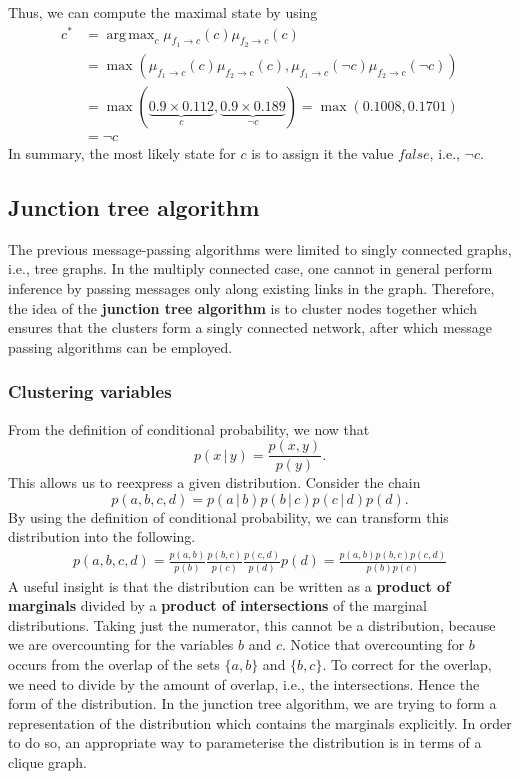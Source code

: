 \documentclass{article}
\DeclareMathOperator*{\argmax}{arg\,max}
\newcommand{\giv}{\,|\,}
\begin{document}
\noindent Thus, we can compute the maximal state by using
\begin{align*}
    c^* &= \argmax_c \mu_{f_1 \rightarrow c}(c) \mu_{f_2 \rightarrow c}(c)\\
    &= \max(\mu_{f_1 \rightarrow c}(c) \mu_{f_2 \rightarrow c}(c), \mu_{f_1 \rightarrow c}(\neg c) \mu_{f_2 \rightarrow c}(\neg c)) \\
    &= \max(\underbrace{0.9 \times 0.112}_{c}, \underbrace{0.9 \times 0.189}_{\neg c}) = \max(0.1008, 0.1701)\\
    &= \neg c
\end{align*}
\noindent In summary, the most likely state for $c$ is to assign it the value $false$, i.e., $\neg c$.

\subsection{Junction tree algorithm}

The previous message-passing algorithms were limited to singly connected graphs, i.e., tree graphs. In the multiply connected case, one cannot in general perform inference by passing messages only along existing links in the graph. Therefore, the idea of the \textbf{junction tree algorithm} is to cluster nodes together which ensures that the clusters form a singly connected network, after which message passing algorithms can be employed. 

\subsubsection{Clustering variables}

From the definition of conditional probability, we now that
$$
    p(x \giv y) = \frac{p(x, y)}{p(y)}.
$$
\noindent This allows us to reexpress a given distribution. Consider the chain
$$
    p(a, b, c, d) = p(a \giv b)p(b \giv c) p(c \giv d) p(d).
$$
\noindent By using the definition of conditional probability, we can transform this distribution into the following.
\begin{align*}
    p(a, b, c, d) = \frac{p(a, b)}{p(b)}\frac{p(b, c)}{p(c)}\frac{p(c, d)}{p(d)} p(d) = \frac{p(a, b)p(b, c)p(c, d)}{p(b)p(c)}
\end{align*}
\noindent A useful insight is that the distribution can be written as a \textbf{product of marginals} divided by a \textbf{product of intersections} of the marginal distributions. Taking just the numerator, this cannot be a distribution, because we are overcounting for the variables $b$ and $c$. Notice that overcounting for $b$ occurs from the overlap of the sets $\{a, b\}$ and $\{b, c\}$. To correct for the overlap, we need to divide by the amount of overlap, i.e., the intersections. Hence the form of the distribution. In the junction tree algorithm, we are trying to form a representation of the distribution which contains the marginals explicitly. In order to do so, an appropriate way to parameterise the distribution is in terms of a clique graph.
\end{document}
